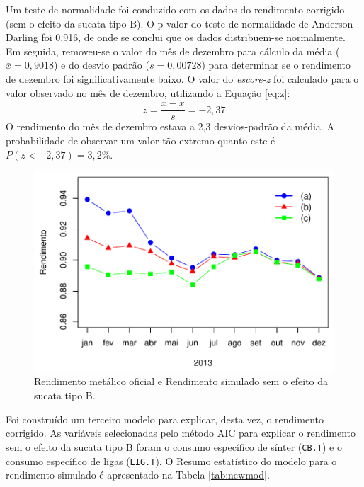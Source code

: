 \begin{multicols}{2}
	Um teste de normalidade foi conduzido com os dados do rendimento corrigido (sem o efeito da sucata tipo B). O p-valor do teste de normalidade de Anderson-Darling foi 0.916, de onde se conclui que os dados distribuem-se normalmente. Em seguida, removeu-se o valor do mês de dezembro para cálculo da média ($\bar{x} = 0,9018$) e do desvio padrão ($s=0,00728$) para determinar se o rendimento de dezembro foi significativamente baixo. O valor do \emph{escore-z} foi calculado para o valor observado no mês de dezembro, utilizando a Equação \ref{eq:z}:
	\begin{equation}
		\label{eq:z}
		z = \frac{x - \bar{x}}{s} = -2,37
	\end{equation}
	O rendimento do mês de dezembro estava a 2,3 desvios-padrão da média. A probabilidade de observar um valor tão extremo quanto este é $P(z<-2,37)=3,2\%$.
	\begin{figure}[H]
		\centering
		\includegraphics[scale=0.55, bb=0 0 288 432, trim=0in 0in 0in 0in]{figures/fig09.pdf} %
		\caption{Rendimento metálico oficial\cite{rel2} e Rendimento simulado sem o efeito da sucata tipo B.}
		\label{fig:new_rend}
	\end{figure}				
	Foi construído um terceiro modelo para explicar, desta vez, o rendimento corrigido. As variáveis selecionadas pelo método AIC para explicar o rendimento sem o efeito da sucata tipo B foram o consumo específico de sínter (\texttt{CB.T}) e o consumo específico de ligas (\texttt{LIG.T}). O Resumo estatístico do modelo para o rendimento simulado é apresentado na Tabela \ref{tab:newmod}.
		\begin{table}[H]
	\begin{center}
	\begin{small}

\end{small}
\end{center}
\end{table}
\end{multicols}
